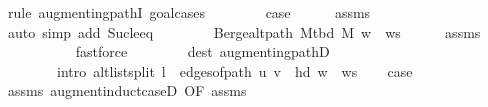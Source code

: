 \begin{isabellebody}
\ {\isacharparenleft}{\kern0pt}rule\ augmenting{\isacharunderscore}{\kern0pt}pathI{\isacharcomma}{\kern0pt}\ goal{\isacharunderscore}{\kern0pt}cases{\isacharparenright}{\kern0pt}\isanewline
\ \ \isamarkupfalse%
\ {}\isanewline
\ \ \isamarkupfalse%
\ {\isacharquery}{\kern0pt}case\isanewline
\ \ \ \ \isamarkupfalse%
\ assms{\isacharparenleft}{\kern0pt}{}{\isacharparenright}{\kern0pt}\isanewline
\ \ \ \ \isamarkupfalse%
\ {\isacharparenleft}{\kern0pt}auto\ simp\ add{\isacharcolon}{\kern0pt}\ Suc{\isacharunderscore}{\kern0pt}le{\isacharunderscore}{\kern0pt}eq{\isacharparenright}{\kern0pt}\isanewline
{}\isamarkupfalse%
\isanewline
\ \ \isamarkupfalse%
\ {}\isanewline
\ \ \isamarkupfalse%
\ {\isachardoublequoteopen}Berge{\isachardot}{\kern0pt}alt{\isacharunderscore}{\kern0pt}path\ {\isacharparenleft}{\kern0pt}M{\isacharunderscore}{\kern0pt}tbd\ M{\isacharparenright}{\kern0pt}\ {\isacharparenleft}{\kern0pt}w\ {\isacharhash}{\kern0pt}\ ws{\isacharparenright}{\kern0pt}{\isachardoublequoteclose}\isanewline
\ \ \ \ \isamarkupfalse%
\ assms{\isacharparenleft}{\kern0pt}{}{\isacharparenright}{\kern0pt}\isanewline
\ \ \ \ \isamarkupfalse%
\isanewline
\ \ \ \ \ \ {\isacharparenleft}{\kern0pt}fastforce\isanewline
\ \ \ \ \ \ \ \ dest{\isacharcolon}{\kern0pt}\ augmenting{\isacharunderscore}{\kern0pt}pathD{\isacharparenleft}{\kern0pt}{}{\isacharparenright}{\kern0pt}\isanewline
\ \ \ \ \ \ \ \ intro{\isacharcolon}{\kern0pt}\ alt{\isacharunderscore}{\kern0pt}list{\isacharunderscore}{\kern0pt}split{\isacharunderscore}{\kern0pt}{}{\isacharbrackleft}{\kern0pt}\ {\isacharquery}{\kern0pt}l{}{\isachardot}{\kern0pt}{}\ {\isacharequal}{\kern0pt}\ {\isachardoublequoteopen}edges{\isacharunderscore}{\kern0pt}of{\isacharunderscore}{\kern0pt}path\ {\isacharparenleft}{\kern0pt}{\isacharbrackleft}{\kern0pt}u{\isacharcomma}{\kern0pt}\ v{\isacharbrackright}{\kern0pt}\ {\isacharat}{\kern0pt}\ {\isacharbrackleft}{\kern0pt}hd\ {\isacharparenleft}{\kern0pt}w\ {\isacharhash}{\kern0pt}\ ws{\isacharparenright}{\kern0pt}{\isacharbrackright}{\kern0pt}{\isacharparenright}{\kern0pt}{\isachardoublequoteclose}{\isacharbrackright}{\kern0pt}{\isacharparenright}{\kern0pt}\isanewline
\ \ \isamarkupfalse%
\ {\isacharquery}{\kern0pt}case\isanewline
\ \ \ \ \isamarkupfalse%
\ assms\ augment{\isacharunderscore}{\kern0pt}induct{\isacharunderscore}{\kern0pt}case{\isacharunderscore}{\kern0pt}{}D{\isacharparenleft}{\kern0pt}{}{\isacharcomma}{\kern0pt}\ {}{\isacharparenright}{\kern0pt}{\isacharbrackleft}{\kern0pt}OF\ assms{\isacharbrackright}{\kern0pt}\isanewline

\end{isabellebody}
